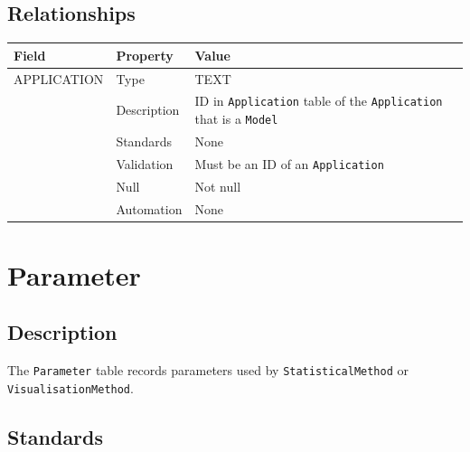 \documentclass[
]{article}
\newcounter{none}
\begin{document}
\subsection{Relationships}\label{relationships-16}

{\def\LTcaptype{none} 
\begin{longtable}[]{@{}
  >{\raggedright\arraybackslash}p{}
  >{\raggedright\arraybackslash}p{}
  >{\raggedright\arraybackslash}p{}@{}}
\toprule\noalign{}
\begin{minipage}[b]{\linewidth}\raggedright
Field
\end{minipage} & \begin{minipage}[b]{\linewidth}\raggedright
Property
\end{minipage} & \begin{minipage}[b]{\linewidth}\raggedright
Value
\end{minipage} \\
\midrule\noalign{}
\endhead
\bottomrule\noalign{}
\endlastfoot
APPLICATION & Type & TEXT \\
& Description & ID in \texttt{Application} table of the
\texttt{Application} that is a \texttt{Model} \\
& Standards & None \\
& Validation & Must be an ID of an \texttt{Application} \\
& Null & Not null \\
& Automation & None \\
\end{longtable}
}

\section{Parameter}\label{parameter}

\subsection{Description}\label{description-19}

The \texttt{Parameter} table records parameters used by
\texttt{StatisticalMethod} or \texttt{VisualisationMethod}.

\subsection{Standards}\label{standards-21}
\end{document}
